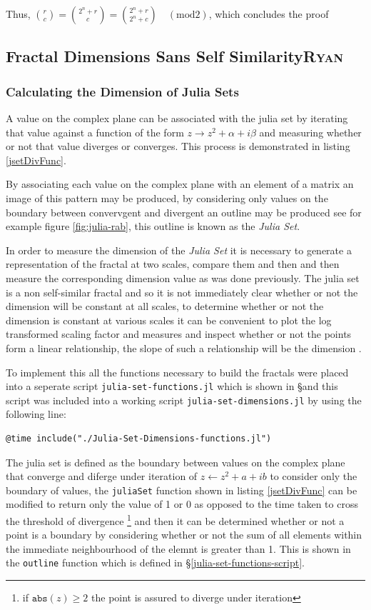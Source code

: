 \documentclass[a4paper,11pt,twoside]{article}
\begin{document}
Thus, \(\binom{r}{c} = \binom{2^n + r}{c} = \binom{2^n + r}{2^n + c} \quad (\text{mod} 2)\), which concludes the proof

\subsection{Fractal Dimensions Sans Self Similarity\hfill{}\textsc{Ryan}}
\label{sec:org06fc47f}
\subsubsection{Calculating the Dimension of Julia Sets}
\label{jl-set-dim}
A value on the complex plane can be associated with the julia set by iterating
that value against a function of the form \(z \rightarrow z^{2} + \alpha + i
\beta\) and measuring whether or not that value diverges or converges. This
process is demonstrated in listing \ref{jsetDivFunc}.

By associating each value on the complex plane with an element of a matrix an image of this pattern may be produced, by considering only values on the boundary between convervgent and divergent an outline may be produced see for example figure \ref{fig:julia-rab}, this outline is known as the \emph{Julia Set}.

In order to measure the dimension of the \emph{Julia Set} it is necessary to generate
a representation of the fractal at two scales, compare them and then and then
measure the corresponding dimension value as was done previously. The julia set
is a non self-similar fractal and so it is not immediately clear whether or not
the dimension will be constant at all scales, to determine whether or not the
dimension is constant at various scales it can be convenient to plot the log
transformed scaling factor and measures and inspect whether or not the points
form a linear relationship, the slope of such a relationship will be the
dimension \cite[p. 30]{vicsekFractalGrowthPhenomena1992}.

To implement this all the functions necessary to build the fractals were placed into a seperate script \texttt{julia-set-functions.jl} which is shown in \S and this script was included into a working script \texttt{julia-set-dimensions.jl} by using the following line:

\begin{verbatim}
@time include("./Julia-Set-Dimensions-functions.jl")
\end{verbatim}


The julia set is defined as the boundary between values on the complex plane that converge and diferge under iteration of \(z\leftarrow z^{2} + a+ib\) to consider only the boundary of values, the \texttt{juliaSet} function shown in  listing \ref{jsetDivFunc} can be modified to return only the value of 1 or 0 as opposed to the time taken to cross the threshold of divergence \footnote{if \(\mathtt{abs}\left(z\right) \geq 2\) the point is assured to diverge under iteration} and then it can be determined whether or not a point is a boundary by considering whether or not the sum of all elements within the immediate neighbourhood of the elemnt is greater than 1. This is shown in the \texttt{outline} function which is defined in \S \ref{julia-set-functions-script}.
\end{document}
